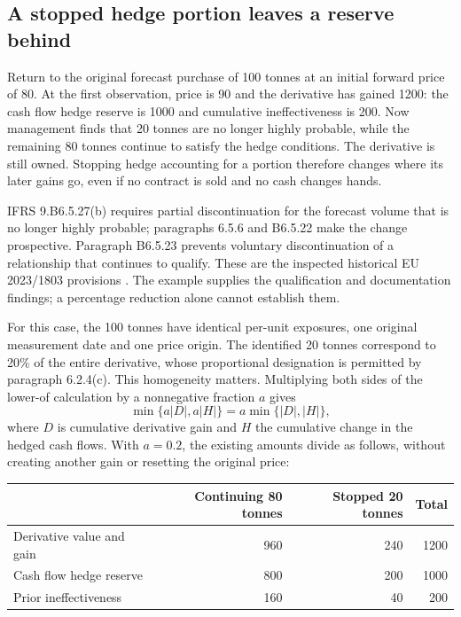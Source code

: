 \subsection{A stopped hedge portion leaves a reserve behind}
\label{sec:partial-hedge-discontinuation}

Return to the original forecast purchase of 100 tonnes at an initial forward
price of 80. At the first observation, price is 90 and the derivative has
gained 1200: the cash flow hedge reserve is 1000 and cumulative
ineffectiveness is 200. Now management finds that 20 tonnes are no longer
highly probable, while the remaining 80 tonnes continue to satisfy the hedge
conditions. The derivative is still owned. Stopping hedge accounting for a
portion therefore changes where its later gains go, even if no contract is
sold and no cash changes hands.

IFRS 9.B6.5.27(b) requires partial discontinuation for the forecast volume
that is no longer highly probable; paragraphs 6.5.6 and B6.5.22 make the
change prospective. Paragraph B6.5.23 prevents voluntary discontinuation of
a relationship that continues to qualify. These are the inspected historical
EU 2023/1803 provisions \citep{eu20231803}. The example supplies the
qualification and documentation findings; a percentage reduction alone cannot
establish them.

For this case, the 100 tonnes have identical per-unit exposures, one original
measurement date and one price origin. The identified 20 tonnes correspond
to 20\% of the entire derivative, whose proportional designation is permitted
by paragraph 6.2.4(c). This homogeneity matters. Multiplying both sides of the
lower-of calculation by a nonnegative fraction \(a\) gives
\[
 \min\{a|D|,a|H|\}=a\min\{|D|,|H|\},
\]
where \(D\) is cumulative derivative gain and \(H\) the cumulative change
in the hedged cash flows. With \(a=0.2\), the existing amounts divide as
follows, without creating another gain or resetting the original price:

\begin{center}
\small
\begin{tabular}{lrrr}
\toprule
& Continuing 80 tonnes & Stopped 20 tonnes & Total\\
\midrule
Derivative value and gain & 960 & 240 & 1200\\
Cash flow hedge reserve & 800 & 200 & 1000\\
Prior ineffectiveness & 160 & 40 & 200\\
\bottomrule
\end{tabular}
\end{center}

